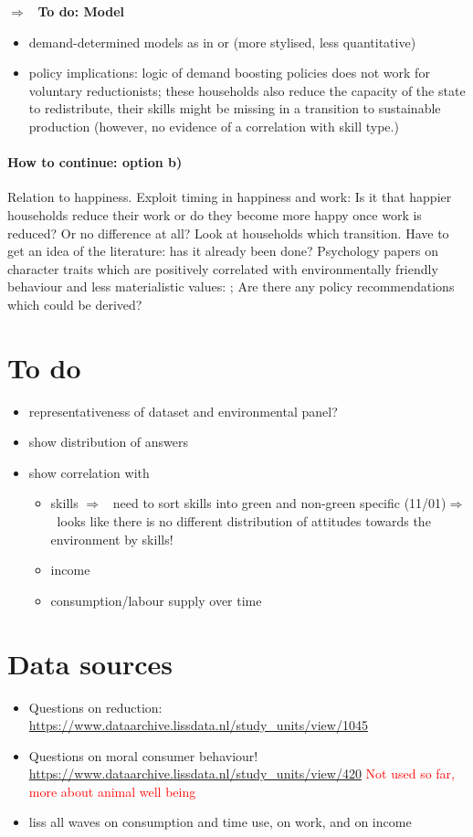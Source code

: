 \documentclass[12pt]{article}
\newcommand{\ar}{$\Rightarrow$ \ }
\newcommand{\tr}[1]{\textcolor{red}{#1}}
\begin{document}
\ar \textbf{To do: Model}
\begin{itemize}
\item demand-determined models as in \cite{Michaillat2015AggregateUnemployment} or (more stylised, less quantitative) \cite{Auerbach2021InequalityEconomy}
\item policy implications: logic of demand boosting policies does not work for voluntary reductionists; these households also reduce the capacity of the state to redistribute, their skills might be missing in a transition to sustainable production (however, no evidence of a correlation with skill type.)
\end{itemize}

\paragraph{How to continue: option b)}
 Relation to happiness. Exploit timing in happiness and work: Is it that happier households reduce their work or do they become more happy once work is reduced? Or no difference at all? Look at households which transition. 
 Have to get an idea of the literature: has it already been done? Psychology papers on character traits which are positively correlated with environmentally friendly behaviour and less materialistic values: \cite{Brown2005AreLifestyle,Heikkinen2015DegrowthConsumers}; Are there any policy recommendations which could be derived?


\section{To do}
\begin{itemize}
	\item representativeness of dataset and environmental panel?
	\item show distribution of answers \checkmark
	\item show correlation with 
	\begin{itemize}
		\item skills \ar need to sort skills into green and non-green specific (11/01)\ar looks like there is no different distribution of attitudes towards the environment by skills! \checkmark
		\item income
		\item consumption/labour supply over time \checkmark
	\end{itemize}
\end{itemize}

\section{Data sources}
\begin{itemize}
\item 
Questions on reduction:
\url{https://www.dataarchive.lissdata.nl/study_units/view/1045}
\item Questions on moral consumer behaviour! 
\url{https://www.dataarchive.lissdata.nl/study_units/view/420} \tr{Not used so far, more about animal well being}
\item liss all waves on consumption and time use, on work, and on income
\end{itemize}
\end{document}
